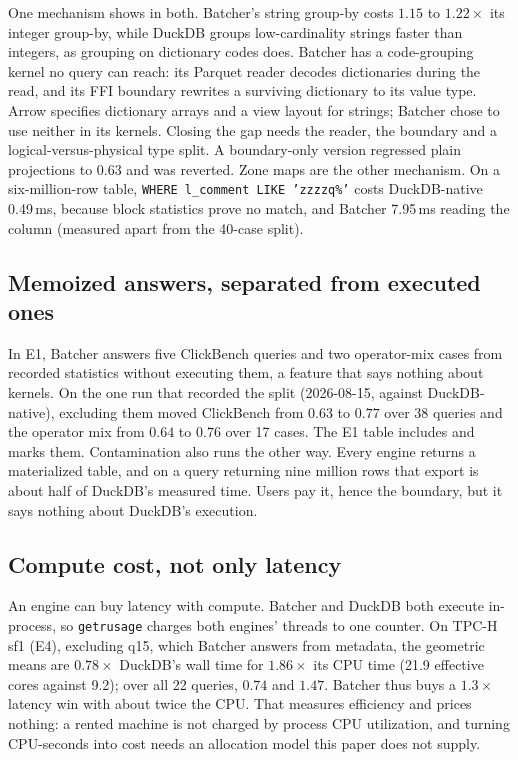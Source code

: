 \documentclass[10pt,twocolumn,letterpaper]{article}   %
\newcommand{\sys}{Batcher}
\newcommand{\E}[1]{\textsf{E#1}}
\begin{document}
One mechanism shows in both. \sys{}'s string group-by costs $1.15$ to $1.22\times$ its integer
group-by, while DuckDB groups low-cardinality strings faster than integers, as grouping on
dictionary codes does. \sys{} has a code-grouping kernel no query can reach: its Parquet reader
decodes dictionaries during the read, and its FFI boundary rewrites a surviving dictionary to its
value type. Arrow specifies dictionary arrays and a view layout for strings; \sys{} chose to
use neither in its kernels. Closing the gap needs the reader, the boundary and a
logical-versus-physical type split. A boundary-only version regressed plain projections to
$0.63$ and was reverted. Zone maps are the other mechanism. On a six-million-row table,
\texttt{WHERE l\_comment LIKE 'zzzzq\%'} costs DuckDB-native 0.49\,ms, because block statistics
prove no match, and \sys{} 7.95\,ms reading the column (measured apart from the 40-case split).

\subsection{Memoized answers, separated from executed ones}
\label{sec:eval-exec}

In \E{1}, \sys{} answers five ClickBench queries and two operator-mix cases from recorded
statistics without executing them, a feature that says nothing about kernels. On the one run
that recorded the split (2026-08-15, against DuckDB-native), excluding them moved ClickBench from
$0.63$ to $0.77$ over 38 queries and the operator mix from $0.64$ to $0.76$ over 17 cases. The
\E{1} table includes and marks them. Contamination also runs the other way. Every engine returns
a materialized table, and on a query returning nine million rows that export is about half of
DuckDB's measured time. Users pay it, hence the boundary, but it says nothing about DuckDB's
execution.

\subsection{Compute cost, not only latency}
\label{sec:eval-cost}

An engine can buy latency with compute. \sys{} and DuckDB both execute in-process, so
\texttt{getrusage} charges both engines' threads to one counter. On TPC-H sf1 (\E{4}), excluding
q15, which \sys{} answers from metadata, the geometric means are $0.78\times$ DuckDB's wall time
for $1.86\times$ its CPU time (21.9 effective cores against 9.2); over all 22 queries, $0.74$ and
$1.47$. \sys{} thus buys a $1.3\times$ latency win with about twice the CPU. That measures
efficiency and prices nothing: a rented machine is not charged by process CPU utilization, and
turning CPU-seconds into cost needs an allocation model this paper does not supply.
\end{document}
